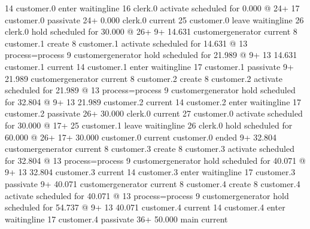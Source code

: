 \documentclass[letterpaper,10pt,english]{sphinxmanual}
\begin{document}
\begin{sphinxVerbatim}[commandchars=\\\{\}]
   14                                   customer.0                           enter waitingline
   16                                   clerk.0 activate                     scheduled for      0.000 @   24+
   17                                   customer.0 passivate
   24+       0.000 clerk.0              current
   25                                   customer.0                           leave waitingline
   26                                   clerk.0 hold                         scheduled for     30.000 @   26+
    9+      14.631 customergenerator    current
    8                                   customer.1 create
    8                                   customer.1 activate                  scheduled for     14.631 @   13  process=process
    9                                   customergenerator hold               scheduled for     21.989 @    9+
   13       14.631 customer.1           current
   14                                   customer.1                           enter waitingline
   17                                   customer.1 passivate
    9+      21.989 customergenerator    current
    8                                   customer.2 create
    8                                   customer.2 activate                  scheduled for     21.989 @   13  process=process
    9                                   customergenerator hold               scheduled for     32.804 @    9+
   13       21.989 customer.2           current
   14                                   customer.2                           enter waitingline
   17                                   customer.2 passivate
   26+      30.000 clerk.0              current
   27                                   customer.0 activate                  scheduled for     30.000 @   17+
   25                                   customer.1                           leave waitingline
   26                                   clerk.0 hold                         scheduled for     60.000 @   26+
   17+      30.000 customer.0           current
                                        customer.0 ended
    9+      32.804 customergenerator    current
    8                                   customer.3 create
    8                                   customer.3 activate                  scheduled for     32.804 @   13  process=process
    9                                   customergenerator hold               scheduled for     40.071 @    9+
   13       32.804 customer.3           current
   14                                   customer.3                           enter waitingline
   17                                   customer.3 passivate
    9+      40.071 customergenerator    current
    8                                   customer.4 create
    8                                   customer.4 activate                  scheduled for     40.071 @   13  process=process
    9                                   customergenerator hold               scheduled for     54.737 @    9+
   13       40.071 customer.4           current
   14                                   customer.4                           enter waitingline
   17                                   customer.4 passivate
   36+      50.000 main                 current


\end{sphinxVerbatim}
\end{document}
